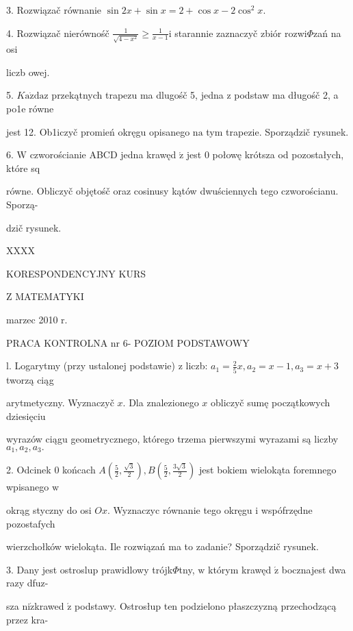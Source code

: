 \documentclass[a4paper,12pt]{article}
\begin{document}
3. Rozwiązač równanie $\sin 2x+\sin x=2+\cos x-2\cos^{2}x.$

4. Rozwiązač nierównośč $\displaystyle \frac{1}{\sqrt{4-x^{2}}}\geq\frac{1}{x-1} \mathrm{i}$ starannie zaznaczyč zbiór rozwi$\Phi$zań na osi

liczb owej.

5. $K\mathrm{a}\dot{\mathrm{z}}\mathrm{d}\mathrm{a}\mathrm{z}$ przekątnych trapezu ma dlugośč 5, jedna $\mathrm{z}$ podstaw ma długośč 2, a po1e równe

jest 12. Ob1iczyč promień okręgu opisanego $\mathrm{n}\mathrm{a}$ tym trapezie. Sporządzič rysunek.

6. $\mathrm{W}$ czworościanie ABCD jedna krawęd $\acute{\mathrm{z}}$ jest $0$ połowę krótsza od pozostałych, które sq

równe. Obliczyč objętośč oraz cosinusy kątów dwuściennych tego czworościanu. Sporzą-

dzič rysunek.





XXXX

KORESPONDENCYJNY KURS

Z MATEMATYKI

marzec 2010 r.

PRACA KONTROLNA nr 6- POZIOM PODSTAWOWY

l. Logarytmy (przy ustalonej podstawie) $\mathrm{z}$ liczb: $a_{1}=\displaystyle \frac{2}{5}x, a_{2}=x-1, a_{3}=x+3$ tworzą ciąg

arytmetyczny. Wyznaczyč $x$. Dla znalezionego $x$ obliczyč sumę początkowych dziesięciu

wyrazów ciągu geometrycznego, którego trzema pierwszymi wyrazami są liczby $a_{1}, a_{2}, a_{3}.$

2. Odcinek $0$ końcach $A(\displaystyle \frac{5}{2},\frac{\sqrt{3}}{2}), B(\displaystyle \frac{5}{2},\frac{3\sqrt{3}}{2})$ jest bokiem wielokąta foremnego wpisanego $\mathrm{w}$

okrąg styczny do osi $Ox$. Wyznaczyc równanie tego okręgu $\mathrm{i}$ wspófrzędne pozostafych

wierzchołków wielokąta. Ile rozwiązań ma to zadanie? Sporządzič rysunek.

3. Dany jest ostroslup prawidlowy trójk$\Phi$tny, $\mathrm{w}$ którym krawęd $\acute{\mathrm{z}}$ bocznajest dwa razy dfuz-

sza $\mathrm{n}\mathrm{i}\dot{\mathrm{z}}$krawed $\acute{\mathrm{z}}$ podstawy. Ostrosłup ten podzielono płaszczyzną przechodzącą przez kra-
\end{document}
